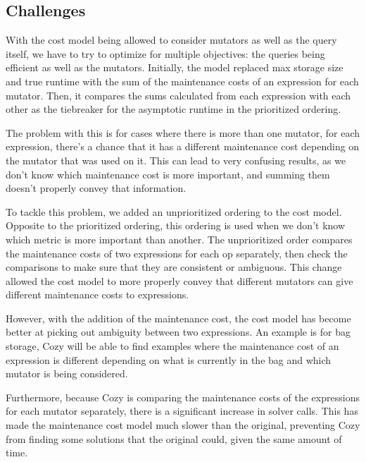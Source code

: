 \subsection{Challenges}
With the cost model being allowed to consider mutators as well as the query
itself, we have to try to optimize for multiple objectives: the queries being
efficient as well as the mutators. Initially, the model replaced max storage
size and true runtime with the sum of the maintenance costs of an expression for
each mutator. Then, it compares the sums calculated from each expression with
each other as the tiebreaker for the asymptotic runtime in the prioritized
ordering.

The problem with this is for cases where there is more than one mutator, for
each expression, there's a chance that it has a different maintenance cost
depending on the mutator that was used on it. This can lead to very confusing
results, as we don't know which maintenance cost is more important, and summing
them doesn't properly convey that information.

To tackle this problem, we added an unprioritized ordering to the cost model.
Opposite to the prioritized ordering, this ordering is used when we don't know
which metric is more important than another. The unprioritized order compares
the maintenance costs of two expressions for each op separately, then check the
comparisons to make sure that they are consistent or ambiguous. This change
allowed the cost model to more properly convey that different mutators can give
different maintenance costs to expressions.

However, with the addition of the maintenance cost, the cost model has become
better at picking out ambiguity between two expressions. An example is for bag
storage, Cozy will be able to find examples where the maintenance cost of an
expression is different depending on what is currently in the bag and which
mutator is being considered.

Furthermore, because Cozy is comparing the maintenance costs of the expressions
for each mutator separately, there is a significant increase in solver calls.
This has made the maintenance cost model much slower than the original,
preventing Cozy from finding some solutions that the original could, given the
same amount of time.
